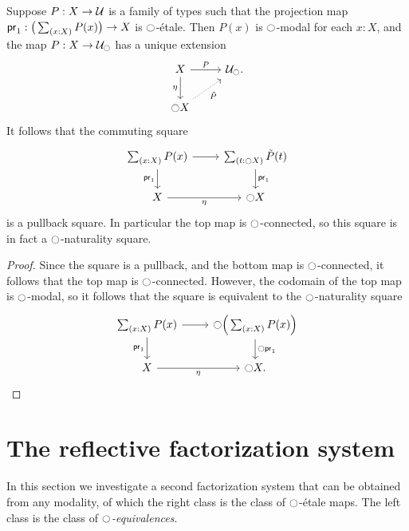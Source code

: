 \documentclass[9pt,twosided]{amsart}
\begin{document}
\begin{cor}
Suppose $P:X\to\mathcal{U}$ is a family of types such that the projection map $\proj 1:\big(\sm{x:X}P(x)\big)\to X$ is ${\ocircle}$-\'etale. Then $P(x)$ is ${\ocircle}$-modal for each $x:X$, and the map $P:X\to\mathcal{U}_{\ocircle}$ has a unique extension
\begin{equation*}
\begin{tikzcd}
X \arrow[d,swap,"\modalunit"] \arrow[r,"P"] & \UU_\modal. \\
\modal X \arrow[ur,densely dotted,swap,"\tilde{P}"] 
\end{tikzcd}
\end{equation*}
It follows that the commuting square
\begin{equation*}
\begin{tikzcd}
\sm{x:X}P(x) \arrow[d,swap,"\proj 1"] \arrow[r] & \sm{t:\modal X}\tilde{P}(t) \arrow[d,"\proj 1"] \\
X \arrow[r,swap,"\modalunit"] & \modal X
\end{tikzcd}
\end{equation*}
is a pullback square. In particular the top map is ${\ocircle}$-connected, so this square is in fact a ${\ocircle}$-naturality square.
\end{cor}

\begin{proof}
  Since the square is a pullback, and the bottom map is ${\ocircle}$-connected, it follows that the top map is ${\ocircle}$-connected. However, the codomain of the top map is ${\ocircle}$-modal, so it follows that the square is equivalent to the ${\ocircle}$-naturality square
  \begin{equation*}
    \begin{tikzcd}
      \sm{x:X}P(x) \arrow[d,swap,"\proj 1"] \arrow[r] & \modal\Big(\sm{x:X}P(x)\Big) \arrow[d,"\modal \proj 1"] \\
X \arrow[r,swap,"\modalunit"] & \modal X.
    \end{tikzcd}
  \end{equation*}
\end{proof}

\section{The reflective factorization system}

In this section we investigate a second factorization system that can be obtained from any modality, of which the right class is the class of ${\ocircle}$-\'etale maps. The left class is the class of \emph{${\ocircle}$-equivalences}.
\end{document}
